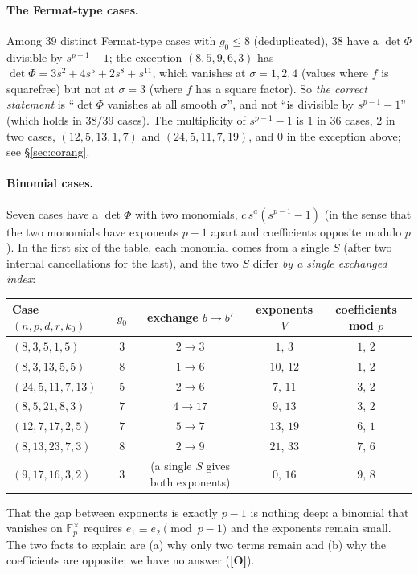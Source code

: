 \documentclass[11pt,a4paper]{article}
\newcommand{\F}{\mathbb{F}}
\begin{document}
\paragraph{The Fermat-type cases.} Among $39$ distinct Fermat-type cases with
$g_0\le8$ (deduplicated), $38$ have a $\det\Phi$ divisible by $s^{p-1}-1$; the
exception $(8,5,9,6,3)$ has $\det\Phi=3s^2+4s^5+2s^8+s^{11}$, which vanishes at
$\sigma=1,2,4$ (values where $f$ is squarefree) but not at $\sigma=3$ (where $f$
has a square factor). So \emph{the correct statement} is ``$\det\Phi$ vanishes at
all smooth $\sigma$'', and not ``is divisible by $s^{p-1}-1$'' (which holds in
$38/39$ cases). The multiplicity of $s^{p-1}-1$ is $1$ in $36$ cases, $2$ in two
cases, $(12,5,13,1,7)$ and $(24,5,11,7,19)$, and $0$ in the exception above; see
\S\ref{sec:corang}.

\paragraph{Binomial cases.} Seven cases have a $\det\Phi$ with two monomials,
$c\,s^a(s^{p-1}-1)$ (in the sense that the two monomials have exponents
$p-1$ apart and coefficients opposite modulo $p$). In the first six of the table,
each monomial comes from a single $S$ (after two internal cancellations for the
last), and the two $S$ differ \emph{by a single exchanged index}:
\begin{center}
\begin{tabular}{lcccc}
Case $(n,p,d,r,k_0)$ & $g_0$ & exchange $b\to b'$ & exponents $V$ & coefficients mod $p$\\\hline
$(8,3,5,1,5)$ & $3$ & $2\to3$ & $1,\,3$ & $1,\,2$\\
$(8,3,13,5,5)$ & $8$ & $1\to6$ & $10,\,12$ & $1,\,2$\\
$(24,5,11,7,13)$ & $5$ & $2\to6$ & $7,\,11$ & $3,\,2$\\
$(8,5,21,8,3)$ & $7$ & $4\to17$ & $9,\,13$ & $3,\,2$\\
$(12,7,17,2,5)$ & $7$ & $5\to7$ & $13,\,19$ & $6,\,1$\\
$(8,13,23,7,3)$ & $8$ & $2\to9$ & $21,\,33$ & $7,\,6$\\
$(9,17,16,3,2)$ & $3$ & (a single $S$ gives both exponents) & $0,\,16$ & $9,\,8$\\\hline
\end{tabular}
\end{center}
That the gap between exponents is exactly $p-1$ is nothing deep: a binomial that
vanishes on $\F_p^\times$ requires $e_1\equiv e_2\pmod{p-1}$ and the exponents
remain small. The two facts to explain are (a) why only two terms remain and (b)
why the coefficients are opposite; we have no answer (\textbf{[O]}).
\end{document}
